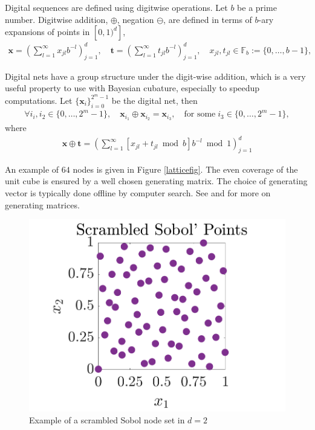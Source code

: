 \documentclass{iitthesis}          %
\newcommand{\bm}[1]{\boldsymbol{#1}}
\newcommand{\vt}{\bm{t}}
\newcommand{\vx}{\bm{x}}
\begin{document}
Digital sequences are defined using digitwise operations. Let $b$ be a prime number. Digitwise addition, $\oplus$, negation $\ominus$, are defined in terms of $b$-ary expansions of points in $[0, 1)^d]$,
\begin{align*}
\vx = \left( \sum_{l=1}^{\infty} x_{jl}b^{-l}\right)_{j=1}^d, \quad
\vt = \left( \sum_{l=1}^{\infty} t_{jl}b^{-l}\right)_{j=1}^d, \quad
x_{jl}, t_{jl} \in \mathbb{F}_b := \{0,\dots,b-1\},
\end{align*}

Digital nets have a group structure under the digit-wise addition, which is a very useful property to use with Bayesian cubature, especially to speedup computations. 
Let $\{\vx_i\}_{i=0}^{2^m-1}$ be the digital net, then
\begin{align*}
\forall i_i, i_2 \in \{0,\dots,2^m-1\}, \quad \vx_{i_1} \oplus \vx_{i_2} = \vx_{i_3}, \quad \text{for some} \; i_3 \in \{0,\dots,2^m-1\},
\end{align*}
where
\begin{align*}
\vx \oplus \vt = \left( \sum_{l=1}^\infty [x_{jl} + t_{jl} \bmod b] b^{-l} \bmod 1 \right)_{j=1}^d
\end{align*}

An example of $64$ nodes is given in Figure  \ref{latticefig}.  The even coverage of the unit cube is ensured by a well chosen generating matrix.  The choice of generating vector is typically done offline by computer search.  See \cite{KuoNuyens2016} and \cite{NuySoft} for more on generating matrices.
\begin{figure}[htp]
	\centering
	\includegraphics[width=0.7\linewidth]{SSobolPoints}
	\caption{Example of a scrambled Sobol node set  in $d=2$ \label{sobolfig} }
\end{figure}


\end{document}
